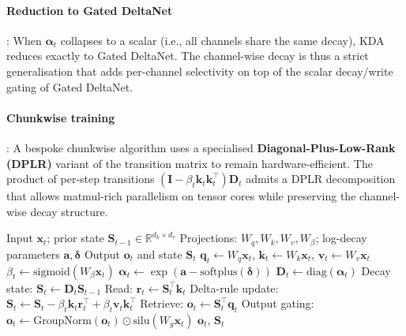 \paragraph{Reduction to Gated DeltaNet}: When $\boldsymbol{\alpha}_t$ collapses to a scalar (i.e., all channels share the same decay), KDA reduces exactly to Gated DeltaNet. The channel-wise decay is thus a strict generalisation that adds per-channel selectivity on top of the scalar decay/write gating of Gated DeltaNet.

\paragraph{Chunkwise training}: A bespoke chunkwise algorithm uses a specialised \textbf{Diagonal-Plus-Low-Rank (DPLR)} variant of the transition matrix to remain hardware-efficient. The product of per-step transitions $(\mathbf{I} - \beta_t \mathbf{k}_t \mathbf{k}_t^\top)\mathbf{D}_t$ admits a DPLR decomposition that allows matmul-rich parallelism on tensor cores while preserving the channel-wise decay structure.

\begin{algorithm}[H]
\caption{Kimi Delta Attention Recurrent Forward (Reference Form)}
\begin{algorithmic}[1]
\Require Input $\mathbf{x}_t$; prior state $\mathbf{S}_{t-1} \in \mathbb{R}^{d_k \times d_v}$
\Require Projections: $W_q, W_k, W_v, W_\beta$; log-decay parameters $\mathbf{a}, \boldsymbol{\delta}$
\Ensure Output $\mathbf{o}_t$ and state $\mathbf{S}_t$
\State $\mathbf{q}_t \gets W_q \mathbf{x}_t$, $\mathbf{k}_t \gets W_k \mathbf{x}_t$, $\mathbf{v}_t \gets W_v \mathbf{x}_t$
\State $\beta_t \gets \mathrm{sigmoid}(W_\beta \mathbf{x}_t)$ 
\State $\boldsymbol{\alpha}_t \gets \exp(\mathbf{a} - \mathrm{softplus}(\boldsymbol{\delta}))$ 
\State $\mathbf{D}_t \gets \mathrm{diag}(\boldsymbol{\alpha}_t)$ 
\State Decay state: $\mathbf{S}_t \gets \mathbf{D}_t \mathbf{S}_{t-1}$
\State Read: $\mathbf{r}_t \gets \mathbf{S}_t^\top \mathbf{k}_t$ 
\State Delta-rule update: $\mathbf{S}_t \gets \mathbf{S}_t - \beta_t \mathbf{k}_t \mathbf{r}_t^\top + \beta_t \mathbf{v}_t \mathbf{k}_t^\top$
\State Retrieve: $\mathbf{o}_t \gets \mathbf{S}_t^\top \mathbf{q}_t$
\State Output gating: $\mathbf{o}_t \gets \mathrm{GroupNorm}(\mathbf{o}_t) \odot \mathrm{silu}(W_g \mathbf{x}_t)$
\State \Return $\mathbf{o}_t$, $\mathbf{S}_t$
\end{algorithmic}
\end{algorithm}

